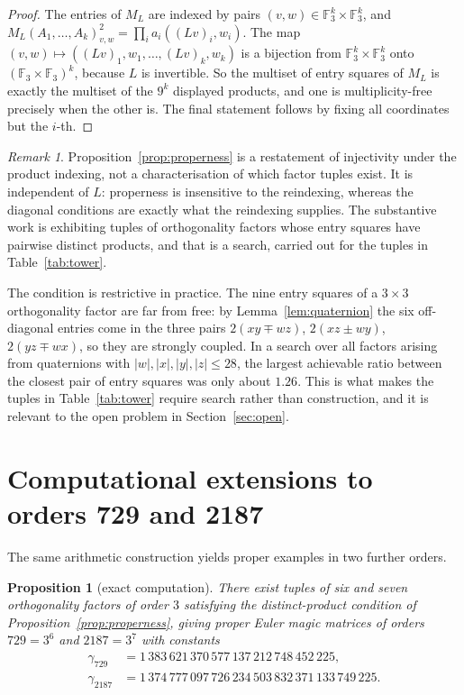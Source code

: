 \documentclass[11pt,a4paper]{amsart}
\theoremstyle{plain}
\newtheorem{proposition}[theorem]{Proposition}
\theoremstyle{definition}
\theoremstyle{remark}
\newtheorem{remark}[theorem]{Remark}
\newcommand{\FF}{\mathbb{F}}
\begin{document}
\begin{proof}
The entries of $M_L$ are indexed by pairs $(v,w)\in\FF_3^k\times\FF_3^k$, and
$M_{L}(A_1,\dots,A_k)_{v,w}^2=\prod_i a_i((Lv)_i,w_i)$. The map
$(v,w)\mapsto((Lv)_1,w_1,\dots,(Lv)_k,w_k)$ is a bijection from
$\FF_3^k\times\FF_3^k$ onto $(\FF_3\times\FF_3)^k$, because $L$ is invertible.
So the multiset of entry squares of $M_L$ is exactly the multiset of the $9^k$
displayed products, and one is multiplicity-free precisely when the other is.
The final statement follows by fixing all coordinates but the $i$-th.
\end{proof}

\begin{remark}
Proposition~\ref{prop:properness} is a restatement of injectivity under the
product indexing, not a characterisation of which factor tuples exist. It is
independent of $L$: properness is insensitive to the reindexing, whereas the
diagonal conditions are exactly what the reindexing supplies. The substantive
work is exhibiting tuples of orthogonality factors whose entry squares have
pairwise distinct products, and that is a search, carried out for the tuples in
Table~\ref{tab:tower}.
\end{remark}

The condition is restrictive in practice. The nine entry squares of a
$3\times3$ orthogonality factor are far from free: by
Lemma~\ref{lem:quaternion} the six off-diagonal entries come in the three pairs
$2(xy\mp wz)$, $2(xz\pm wy)$, $2(yz\mp wx)$, so they are strongly coupled. In a
search over all factors arising from quaternions with $|w|,|x|,|y|,|z|\le28$,
the largest achievable ratio between the closest pair of entry squares was only
about $1.26$. This is what makes the tuples in Table~\ref{tab:tower} require
search rather than construction, and it is relevant to the open problem in
Section~\ref{sec:open}.

\section{Computational extensions to orders 729 and 2187}
\label{sec:computational}

The same arithmetic construction yields proper examples in two further orders.

\begin{proposition}[exact computation]\label{prop:computational}
There exist tuples of six and seven orthogonality factors of order $3$
satisfying the distinct-product condition of
Proposition~\ref{prop:properness}, giving proper Euler magic matrices of orders
$729=3^6$ and $2187=3^7$ with constants
\begin{align*}
\gamma_{729}&=1\,383\,621\,370\,577\,137\,212\,748\,452\,225,\\
\gamma_{2187}&=1\,374\,777\,097\,726\,234\,503\,832\,371\,133\,749\,225 .
\end{align*}
\end{proposition}
\end{document}

